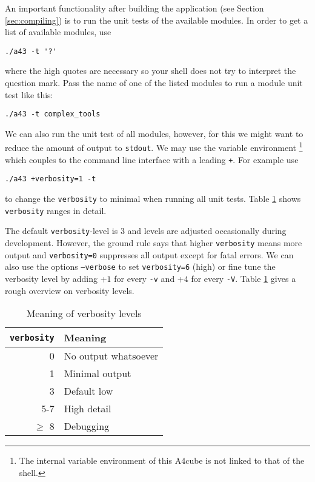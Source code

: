 \documentclass[oribibl]{llncs}
\newcommand{\ttt}[1]{\texttt{#1}}
\newcommand{\codename}{A4cube}
\begin{document}
An important functionality after building the application (see Section \ref{sec:compiling})
is to run the unit tests of the available modules.
In order to get a list of available modules, use 
\begin{verbatim}
./a43 -t '?'
\end{verbatim}
where the high quotes are necessary so your shell does not try to interpret the question mark.
Pass the name of one of the listed modules to run a module unit test like this:
\begin{verbatim}
./a43 -t complex_tools
\end{verbatim}
We can also run the unit test of all modules, however, for this we might want to reduce
the amount of output to \ttt{stdout}.
We may use the variable environment 
\footnote{The internal variable environment of this \codename{} is not linked to that of the shell.}
which couples to the command line interface with a leading \ttt{+}. For example use
\begin{verbatim}
./a43 +verbosity=1 -t
\end{verbatim}
to change the \ttt{verbosity} to minimal when running all unit tests. Table \ref{tab:verbosity-level-meaning} shows \ttt{verbosity} ranges in detail.


The default \ttt{verbosity}-level is $3$ and levels are adjusted occasionally during development.
However, the ground rule says that higher \ttt{verbosity} means more output
and \ttt{verbosity=0} suppresses all output except for fatal errors.
We can also use the options \ttt{--verbose} to set \ttt{verbosity=6} (high)
or fine tune the verbosity level by adding +$1$ for every \ttt{-v} and +$4$ for every \ttt{-V}.
Table \ref{tab:verbosity-level-meaning} gives a rough overview on verbosity levels. 

\begin{table}[ht!]
\caption[Meaning of verbosity levels]{
Meaning of verbosity levels
} \label{tab:verbosity-level-meaning}
\centering
\begin{tabular}{|r|l|}
\hline
  \ttt{verbosity} & Meaning   \\
\hline
     0 & No output whatsoever \\
     1 & Minimal output       \\
     3 & Default low          \\
   5-7 & High detail          \\
   $\geq$ 8 & Debugging       \\
\hline
\end{tabular}
\end{table}
\end{document}

